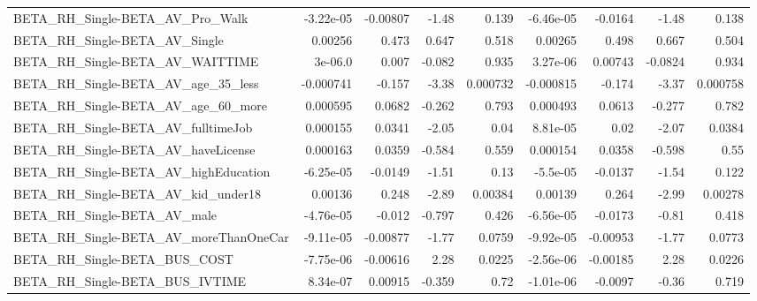\begin{tabular}{lrrrrrrrr}
BETA\_RH\_Single-BETA\_AV\_Pro\_Walk                    &   -3.22e-05 &     -0.00807 &    -1.48 &    0.139 &  -6.46e-05 &     -0.0164 &        -1.48 &         0.138 \\
BETA\_RH\_Single-BETA\_AV\_Single                      &     0.00256 &        0.473 &    0.647 &    0.518 &    0.00265 &       0.498 &        0.667 &         0.504 \\
BETA\_RH\_Single-BETA\_AV\_WAITTIME                    &     3e-06.0 &        0.007 &   -0.082 &    0.935 &   3.27e-06 &     0.00743 &      -0.0824 &         0.934 \\
BETA\_RH\_Single-BETA\_AV\_age\_35\_less                 &   -0.000741 &       -0.157 &    -3.38 & 0.000732 &  -0.000815 &      -0.174 &        -3.37 &      0.000758 \\
BETA\_RH\_Single-BETA\_AV\_age\_60\_more                 &    0.000595 &       0.0682 &   -0.262 &    0.793 &   0.000493 &      0.0613 &       -0.277 &         0.782 \\
BETA\_RH\_Single-BETA\_AV\_fulltimeJob                 &    0.000155 &       0.0341 &    -2.05 &     0.04 &   8.81e-05 &        0.02 &        -2.07 &        0.0384 \\
BETA\_RH\_Single-BETA\_AV\_haveLicense                 &    0.000163 &       0.0359 &   -0.584 &    0.559 &   0.000154 &      0.0358 &       -0.598 &          0.55 \\
BETA\_RH\_Single-BETA\_AV\_highEducation               &   -6.25e-05 &      -0.0149 &    -1.51 &     0.13 &   -5.5e-05 &     -0.0137 &        -1.54 &         0.122 \\
BETA\_RH\_Single-BETA\_AV\_kid\_under18                 &     0.00136 &        0.248 &    -2.89 &  0.00384 &    0.00139 &       0.264 &        -2.99 &       0.00278 \\
BETA\_RH\_Single-BETA\_AV\_male                        &   -4.76e-05 &       -0.012 &   -0.797 &    0.426 &  -6.56e-05 &     -0.0173 &        -0.81 &         0.418 \\
BETA\_RH\_Single-BETA\_AV\_moreThanOneCar              &   -9.11e-05 &     -0.00877 &    -1.77 &   0.0759 &  -9.92e-05 &    -0.00953 &        -1.77 &        0.0773 \\
BETA\_RH\_Single-BETA\_BUS\_COST                       &   -7.75e-06 &     -0.00616 &     2.28 &   0.0225 &  -2.56e-06 &    -0.00185 &         2.28 &        0.0226 \\
BETA\_RH\_Single-BETA\_BUS\_IVTIME                     &    8.34e-07 &      0.00915 &   -0.359 &     0.72 &  -1.01e-06 &     -0.0097 &        -0.36 &         0.719 \\

\end{tabular}
